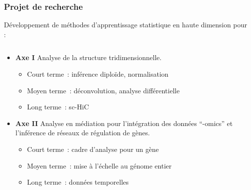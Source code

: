 \documentclass[11pt,xcolor=dvipsnames]{beamer}
\begin{document}
\begin{frame}
\frametitle{Projet de recherche}


Développement de méthodes d'apprentissage
statistique en haute dimension pour :

\begin{overlayarea}{12cm}{5cm}
\small
\begin{columns}
\begin{column}{0.7\linewidth}
\begin{itemize}[leftmargin=*]
\item<2-> {\bf Axe I} \quad Analyse de la structure tridimensionnelle.
\begin{itemize}
\scriptsize
\item<2->[-] Court terme~: inférence diploïde, normalisation
\item<2->[-] Moyen terme~: déconvolution, analyse
différentielle
\item<2->[-] Long terme~: sc-HiC
\end{itemize}
\item<3-> {\bf Axe II} \quad Analyse en médiation pour l'intégration des
données ``-omics'' et l'inférence de réseaux de régulation de gènes.
\begin{itemize}
\scriptsize
\item<3->[-] Court terme~: cadre d'analyse pour un gène
\item<3->[-] Moyen terme~: mise à l'échelle au génome entier
\item<3->[-] Long terme~: données temporelles
\end{itemize}
\end{itemize}
\end{column}
\begin{column}{0.3\linewidth}
\begin{overlayarea}{0.9\linewidth}{2cm}
\end{overlayarea}
\end{column}
\end{columns}

\end{overlayarea}
\end{frame}
\end{document}
